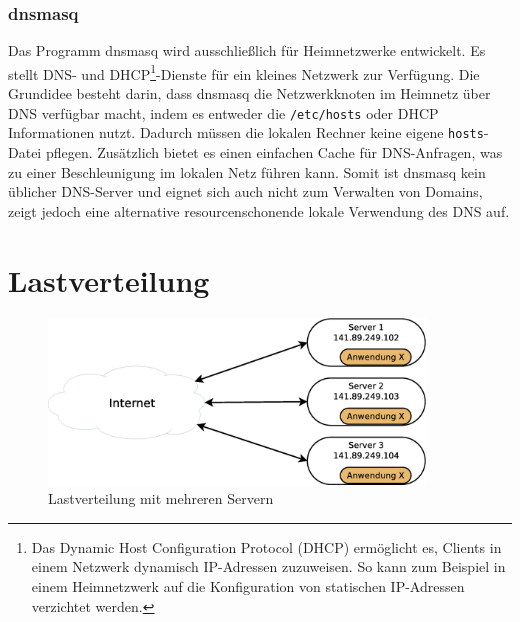 \documentclass[a4paper, 12pt, BCOR10mm, DIV12, toc=bibliography, toc=listof, german]{scrbook}
\begin{document}

				\subsubsection*{dnsmasq} %

				Das Programm dnsmasq \cite{dnsmasq} wird ausschließlich für Heimnetzwerke entwickelt. Es
				stellt DNS- und DHCP\footnote{Das Dynamic Host Configuration Protocol (DHCP) \cite{rfc2131}
				ermöglicht es, Clients in einem Netzwerk dynamisch IP-Adressen zuzuweisen. So kann zum
				Beispiel in einem Heimnetzwerk auf die Konfiguration von statischen IP-Adressen verzichtet
				werden.}-Dienste für ein kleines Netzwerk zur Verfügung. Die Grundidee besteht darin, dass dnsmasq
				die Netzwerkknoten im Heimnetz über DNS verfügbar macht, indem es entweder die
				\texttt{/etc/hosts} oder DHCP Informationen nutzt. Dadurch müssen die lokalen Rechner keine
				eigene \texttt{hosts}-Datei pflegen.  Zusätzlich bietet es einen einfachen Cache für
				DNS-Anfragen, was zu einer Beschleunigung im lokalen Netz führen kann. Somit ist dnsmasq
				kein üblicher DNS-Server und eignet sich auch nicht zum Verwalten von Domains, zeigt jedoch
				eine alternative resourcenschonende lokale Verwendung des DNS auf.




		\section{Lastverteilung} %
		\label{sec:lastverteilung}

		\begin{figure}
			\centering
			\includegraphics[width=10cm]{images/internet-server}
			\caption{Lastverteilung mit mehreren Servern}
			\label{fig:lastverteilung}
		\end{figure}
\end{document}
